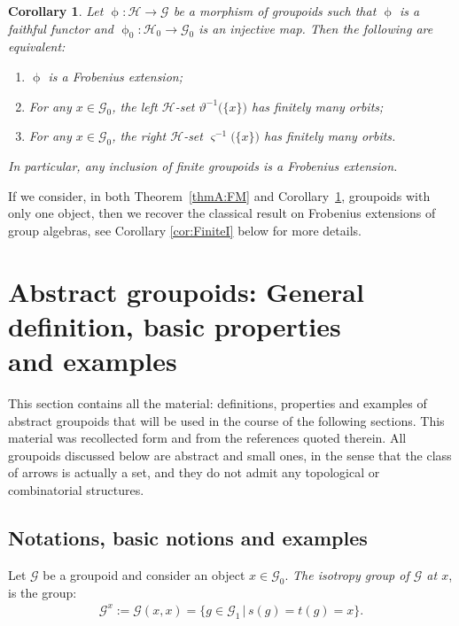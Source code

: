 \documentclass[10pt,a4paper]{amsart}
\numberwithin{equation}{section}
\newtheorem{Corollary}[Theorem]{Corollary}
\newcommand{\Go}{\cG_{\Sscript{0}}}
\newcommand{\Ho}{\cH_{\Sscript{0}}}
\newcommand{\cG}{{\mathcal G}}
\newcommand{\cH}{{\mathcal H}}
\newcommand{\Sscript}[1]{\scriptscriptstyle{#1}}
\begin{document}
\begin{Corollary}\label{coroB:Finite}Let $\upphi\colon \cH \to \cG$ be a morphism of groupoids such that $\upphi$ is a faithful functor and $\upphi_{\Sscript{0}}\colon \Ho \to \Go$ is an injective map. Then the following are equivalent:
\begin{enumerate}[$(a)$]\itemsep=0pt
\item $\upphi$ is a Frobenius extension;
\item For any $x \in \Go$, the left $\cH$-set $\vartheta^{-1}\big(\{x\} \big)$ has finitely many orbits;
\item For any $x \in \Go$, the right $\cH$-set $\varsigma^{-1}\big(\{x\} \big)$ has finitely many orbits.
\end{enumerate}
In particular, any inclusion of finite groupoids is a Frobenius extension.
\end{Corollary}

If we consider, in both Theorem~\ref{thmA:FM} and Corollary~\ref{coroB:Finite}, groupoids with only one object, then we recover the classical result on Frobenius extensions of group algebras, see Corollary \ref{cor:FiniteI} below for more details.

\section[Abstract groupoids: General definition, basic properties and examples]{Abstract groupoids: General definition, basic properties\\ and examples}\label{sec:Grpd}
This section contains all the material: definitions, properties and examples of abstract groupoids that will be used in the course of the following sections. This material was recollected form \cite{ElKaoutit:2015, Kaoutit/Kowalzig:14, Kaoutit/Spinosa:2018} and from the references quoted therein. All groupoids discussed below are abstract and small ones, in the sense that the class of arrows is actually a set, and they do not admit any topological or combinatorial structures.

\subsection{Notations, basic notions and examples}\label{ssec:basic}Let $\cG$ be a groupoid and consider an object $x \in \Go$. \emph{The isotropy group of $\cG$ at $x$}, is the group:
\begin{gather}\label{Eq:isotropy}
\cG^{\Sscript{x}}:=\cG(x,x) = \big\{ g \in \cG_{\Sscript{1}}\,|\, s(g)=t(g)=x \big\}.
\end{gather}
\end{document}
